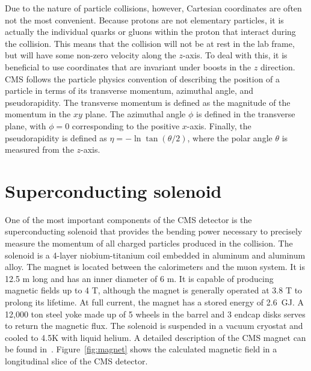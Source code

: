 Due to the nature of particle collisions, however, Cartesian coordinates are often not the most convenient. Because protons are not elementary particles, it is actually the individual quarks or gluons within the proton that interact during the collision. This means that the collision will not be at rest in the lab frame, but will have some non-zero velocity along the $z$-axis. To deal with this, it is beneficial to use coordinates that are invariant under boosts in the $z$ direction. CMS follows the particle physics convention of describing the position of a particle in terms of its transverse momentum, azimuthal angle, and pseudorapidity. The transverse momentum \pt is defined as the magnitude of the momentum in the $xy$ plane. The azimuthal angle $\phi$ is defined in the transverse plane, with $\phi  = 0$ corresponding to the positive $x$-axis. Finally, the pseudorapidity is defined as $\eta = -\ln{\tan{ (\theta / 2 )} } $, where the polar angle $\theta$ is measured from the $z$-axis. 


\section{Superconducting solenoid}
\label{sec:magnet}

One of the most important components of the CMS detector is the superconducting solenoid that provides the bending power necessary to precisely measure the momentum of all charged particles produced in the collision. The solenoid is a 4-layer niobium-titanium coil embedded in aluminum and aluminum alloy. The magnet is located between the calorimeters and the muon system. It is 12.5 m long and has an inner diameter of 6 m. It is capable of producing magnetic fields up to 4 T, although the magnet is generally operated at 3.8 T to prolong its lifetime. At full current, the magnet has a stored energy of 2.6~GJ. A 12,000 ton steel yoke made up of 5 wheels in the barrel and 3 endcap disks serves to return the magnetic flux. The solenoid is suspended in a vacuum cryostat and cooled to 4.5K with liquid helium. A detailed description of the CMS magnet can be found in~\cite{magnetTDR}. Figure~\ref{fig:magnet} shows the calculated magnetic field in a longitudinal slice of the CMS detector.

